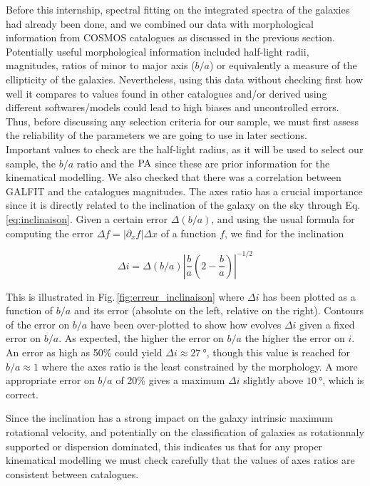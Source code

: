 Before this internship, spectral fitting on the integrated spectra of the galaxies had already been done, and we combined our data with morphological information from COSMOS catalogues as discussed in the previous section. Potentially useful morphological information included half-light radii, magnitudes, ratios of minor to major axis ($b/a$) or equivalently a measure of the ellipticity of the galaxies. Nevertheless, using this data without checking first how well it compares to values found in other catalogues and/or derived using different softwares/models could lead to high biases and uncontrolled errors. Thus, before discussing any selection criteria for our sample, we must first assess the reliability of the parameters we are going to use in later sections. \\

Important values to check are the half-light radius, as it will be used to select our sample, the $b/a$ ratio and the $\rm{PA}$ since these are prior information for the kinematical modelling. We also checked that there was a correlation between GALFIT and the catalogues magnitudes. The axes ratio has a crucial importance since it is directly related to the inclination of the galaxy on the sky through Eq.\,\ref{eq:inclinaison}. Given a certain error $\Delta (b/a)$, and using the usual formula for computing the error $\Delta f = | \partial_x f | \Delta x$ of a function $f$, we find for the inclination

\begin{equation}
	\Delta i = \Delta (b/a) \left | \frac{b}{a} \left ( 2 - \frac{b}{a} \right ) \right | ^{-1/2}
\end{equation}

This is illustrated in Fig.\,\ref{fig:erreur_inclinaison} where $\Delta i$ has been plotted as a function of $b/a$ and its error (absolute on the left, relative on the right). Contours of the error on $b/a$ have been over-plotted to show how evolves $\Delta i$ given a fixed error on $b/a$. As expected, the higher the error on $b/a$ the higher the error on $i$. An error as high as 50\% could yield $\Delta i \approx \SI{27}{\degree}$, though this value is reached for $b/a \approx 1$ where the axes ratio is the least constrained by the morphology. A more appropriate error on $b/a$ of 20\% gives a maximum $\Delta i$ slightly above $\SI{10}{\degree}$, which is correct. 

Since the inclination has a strong impact on the galaxy intrinsic maximum rotational velocity, and potentially on the classification of galaxies as rotationnaly supported or dispersion dominated, this indicates us that for any proper kinematical modelling we must check carefully that the values of axes ratios are consistent between catalogues.

